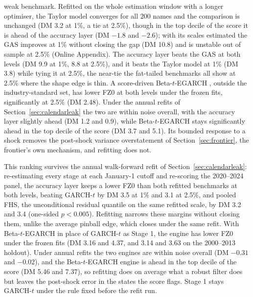 \documentclass[11pt]{article}
\theoremstyle{remark}
\begin{document}
weak benchmark. Refitted on the whole estimation window with a longer optimiser, the Taylor model converges for all $200$ names and the comparison is unchanged (DM 3.2 at 1\%, a tie at 2.5\%), though in the top decile of the score it is ahead of the accuracy layer (DM $-1.8$ and $-2.6$); with its scales estimated the GAS improves at 1\% without closing the gap (DM 10.8) and is unstable out of sample at 2.5\% (Online Appendix). The accuracy layer beats the GAS at both levels (DM 9.9 at 1\%, 8.8 at 2.5\%), and it beats the Taylor model at 1\% (DM 3.8) while tying it at 2.5\%, the near-tie the fat-tailed benchmarks all show at 2.5\% where the shape edge is thin. A score-driven Beta-$t$-EGARCH \citep{harvey2013dynamic}, outside the industry-standard set, has lower FZ0 at both levels under the frozen fits, significantly at 2.5\% (DM 2.48). Under the annual refits of Section~\ref{sec:calendarleak} the two are within noise overall, with the accuracy layer slightly ahead (DM 1.2 and 0.9), while Beta-$t$-EGARCH stays significantly ahead in the top decile of the score (DM 3.7 and 5.1). Its bounded response to a shock removes the post-shock variance overstatement of Section~\ref{sec:frontier}, the frontier's own mechanism, and refitting does not.

This ranking survives the annual walk-forward refit of Section~\ref{sec:calendarleak}: re-estimating every stage at each January-1 cutoff and re-scoring the 2020--2024 panel, the accuracy layer keeps a lower FZ0 than both refitted benchmarks at both levels, beating GARCH-$t$ by DM 3.5 at 1\% and 3.1 at 2.5\%, and pooled FHS, the unconditional residual quantile on the same refitted scale, by DM 3.2 and 3.4 (one-sided $p<0.005$). Refitting narrows these margins without closing them, unlike the average pinball edge, which closes under the same refit. With Beta-$t$-EGARCH in place of GARCH-$t$ as Stage 1, the engine has lower FZ0 under the frozen fits (DM 3.16 and 4.37, and 3.14 and 3.63 on the 2000--2013 holdout). Under annual refits the two engines are within noise overall (DM $-0.31$ and $-0.02$), and the Beta-$t$-EGARCH engine is ahead in the top decile of the score (DM 5.46 and 7.37), so refitting does on average what a robust filter does but leaves the post-shock error in the states the score flags. Stage 1 stays GARCH-$t$ under the rule fixed before the refit run.
\end{document}
